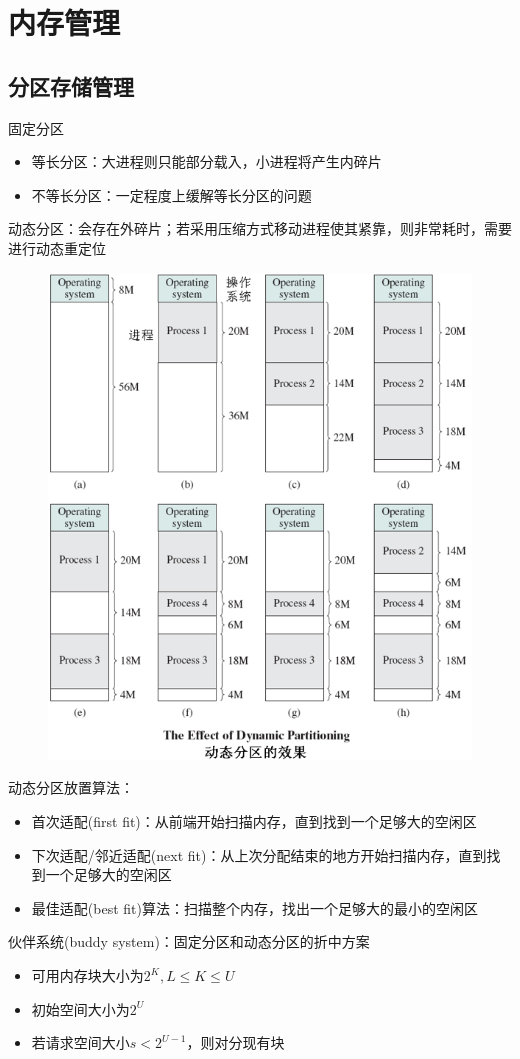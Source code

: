 
\section{内存管理}
\subsection{分区存储管理}
固定分区
\begin{itemize}
    \item 等长分区：大进程则只能部分载入，小进程将产生内碎片
    \item 不等长分区：一定程度上缓解等长分区的问题
\end{itemize}

动态分区：会存在外碎片；若采用压缩方式移动进程使其紧靠，则非常耗时，需要进行动态重定位
\begin{figure}[H]
    \centering
    \includegraphics[width=0.6\linewidth]{fig/dynamic_partition.png}
\end{figure}

动态分区放置算法：
\begin{itemize}
    \item 首次适配(first fit)：从前端开始扫描内存，直到找到一个足够大的空闲区
    \item 下次适配/邻近适配(next fit)：从上次分配结束的地方开始扫描内存，直到找到一个足够大的空闲区
    \item 最佳适配(best fit)算法：扫描整个内存，找出一个足够大的最小的空闲区
\end{itemize}

伙伴系统(buddy system)：固定分区和动态分区的折中方案
\begin{itemize}
    \item 可用内存块大小为$2^K,L\leq K\leq U$
    \item 初始空间大小为$2^U$
    \item 若请求空间大小$s<2^{U-1}$，则对分现有块
\end{itemize}

